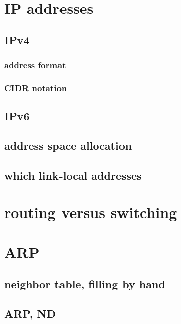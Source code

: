 \section{IP addresses}

\subsection{IPv4}

\subsubsection{address format}


\subsubsection{CIDR notation}


\subsection{IPv6}


\subsection{address space allocation}


\subsection{which link-local addresses}


\section{routing versus switching}




\section{ARP}

\subsection{neighbor table, filling by hand}


\subsection{ARP, ND}

